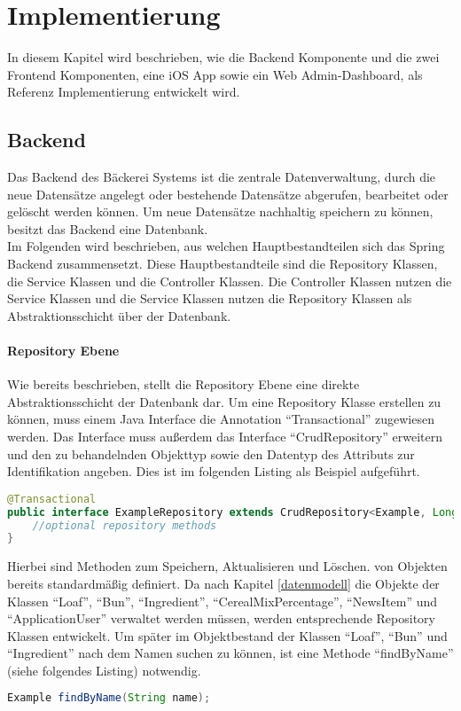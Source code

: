 \chapter{Implementierung}
In diesem Kapitel wird beschrieben, wie die Backend Komponente und die zwei Frontend Komponenten, eine iOS App sowie ein Web Admin-Dashboard, als Referenz Implementierung entwickelt wird. 

\section{Backend}
Das Backend des Bäckerei Systems ist die zentrale Datenverwaltung, durch die neue Datensätze angelegt oder bestehende Datensätze abgerufen, bearbeitet oder gelöscht werden können. Um neue Datensätze nachhaltig speichern zu können, besitzt das Backend eine Datenbank.
\\
Im Folgenden wird beschrieben, aus welchen Hauptbestandteilen sich das Spring Backend zusammensetzt.
Diese Hauptbestandteile sind die Repository Klassen, die Service Klassen und die Controller Klassen.
Die Controller Klassen nutzen die Service Klassen und die Service Klassen nutzen die Repository Klassen als Abstraktionsschicht über der Datenbank.

\clearpage

\subsubsection{Repository Ebene}
Wie bereits beschrieben, stellt die Repository Ebene eine direkte Abstraktionsschicht der Datenbank dar.
Um eine Repository Klasse erstellen zu können, muss einem Java Interface die Annotation \enquote{Transactional} zugewiesen werden. Das Interface muss außerdem das Interface \enquote {CrudRepository} erweitern und den zu behandelnden Objekttyp sowie den Datentyp des Attributs zur Identifikation angeben. Dies ist im folgenden Listing als Beispiel aufgeführt.
\begin{lstlisting}[language=Java]
@Transactional
public interface ExampleRepository extends CrudRepository<Example, Long> {
	//optional repository methods
}
\end{lstlisting}

Hierbei sind Methoden zum Speichern, Aktualisieren und Löschen. von Objekten bereits standardmäßig definiert.
Da nach Kapitel \ref{datenmodell} die Objekte der Klassen \enquote{Loaf}, \enquote{Bun}, \enquote{Ingredient}, \enquote{CerealMixPercentage}, \enquote{NewsItem} und \enquote{ApplicationUser} verwaltet werden müssen, werden entsprechende Repository Klassen entwickelt.
Um später im Objektbestand der Klassen \enquote{Loaf}, \enquote{Bun} und \enquote{Ingredient} nach dem Namen suchen zu können, ist eine Methode \enquote{findByName} (siehe folgendes Listing) notwendig.
\begin{lstlisting}[language=Java]
Example findByName(String name);
\end{lstlisting}

